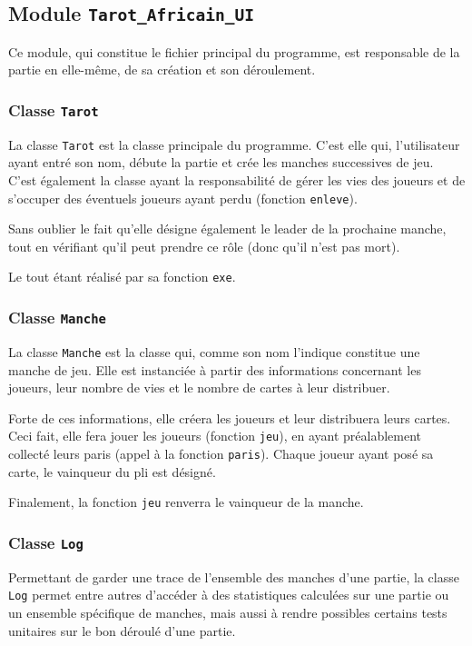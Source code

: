    \subsection{Module \texttt{Tarot\_Africain\_UI}}\label{subsec:module-tarot-africain}
      Ce module, qui constitue le fichier principal du programme, est responsable de la partie en elle-même, de sa création et son déroulement.
      \subsubsection{Classe \texttt{Tarot}}
         La classe \texttt{Tarot} est la classe principale du programme.
         C'est elle qui, l'utilisateur ayant entré son nom, débute la partie et crée les manches successives de jeu.
         C'est également la classe ayant la responsabilité de gérer les vies des joueurs et de s'occuper des éventuels joueurs ayant perdu (fonction \texttt{enleve}).

         Sans oublier le fait qu'elle désigne également le leader de la prochaine manche, tout en vérifiant qu'il peut prendre ce rôle (donc qu'il n'est pas mort).

         Le tout étant réalisé par sa fonction \texttt{exe}.
      \subsubsection{Classe \texttt{Manche}}
         La classe \texttt{Manche} est la classe qui, comme son nom l'indique constitue une manche de jeu.
         Elle est instanciée à partir des informations concernant les joueurs, leur nombre de vies et le nombre de cartes à leur distribuer.

         Forte de ces informations, elle créera les joueurs et leur distribuera leurs cartes.
         Ceci fait, elle fera jouer les joueurs (fonction \texttt{jeu}), en ayant préalablement collecté leurs paris (appel à la fonction \texttt{paris}).
         Chaque joueur ayant posé sa carte, le vainqueur du pli est désigné.

         Finalement, la fonction \texttt{jeu} renverra le vainqueur de la manche.
      \subsubsection{Classe \texttt{Log}}
         Permettant de garder une trace de l'ensemble des manches d'une partie, la classe \texttt{Log} permet entre autres d'accéder à des statistiques calculées sur une partie ou un ensemble spécifique de manches, mais aussi à rendre possibles certains tests unitaires sur le bon déroulé d'une partie.

